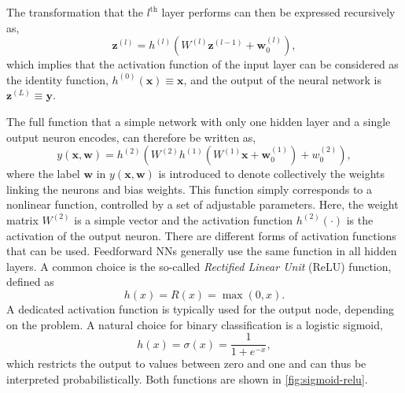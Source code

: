 The transformation that the $l^{\text{th}}$ layer performs can then be expressed recursively as,
\begin{equation}
    \label{eq:recursive-neuron-activation}
    \pmb{z}^{(l)} =  h^{(l)} \left( W^{(l)} \pmb{z}^{(l-1)}  + \pmb{w}^{(l)}_{0} \right),
\end{equation}
which implies that the activation function of the input layer can be considered as the identity function, $h^{(0)}(\pmb{x}) \equiv \pmb{x}$, and the output of the neural network is $ \pmb{z}^{(L)} \equiv \pmb{y}$.

The full function that a simple network with only one hidden layer and a single output neuron encodes, can therefore be written as,
\begin{equation}
    y(\pmb{x}, \pmb{w}) = h^{(2)} \left( W^{(2)} h^{(1)} \left(  W^{(1)} \pmb{x} + \pmb{w}^{(1)}_{0}    \right) + w^{(2)}_{0} \right),
\end{equation}
where the label $\pmb{w}$ in $y(\pmb{x}, \pmb{w})$ is introduced to denote collectively the weights linking the neurons and bias weights.
This function simply corresponds to a nonlinear function, controlled by a set of adjustable parameters. Here, the weight matrix $W^{(2)}$ is a simple vector and the activation function $h^{(2)}(\cdot)$ is the activation of the output neuron.
There are different forms of activation functions that can be used.
Feedforward NNs generally use the same function in all hidden layers.
A common choice is the so-called \emph{Rectified Linear Unit} (ReLU) function, defined as
\begin{equation}
    {h(x)= R(x) = \max(0,x)}.    
\end{equation}
A dedicated activation function is typically used for the output node, depending on the problem.
A natural choice for binary classification is a logistic sigmoid,
\begin{equation}
    \label{eq:logistic-sigmoid}
    h(x)= \sigma(x) = {\frac {1}{1+e^{-x}}},
\end{equation}
which restricts the output to values between zero and one and can thus be interpreted probabilistically.
Both functions are shown in \cref{fig:sigmoid-relu}.

